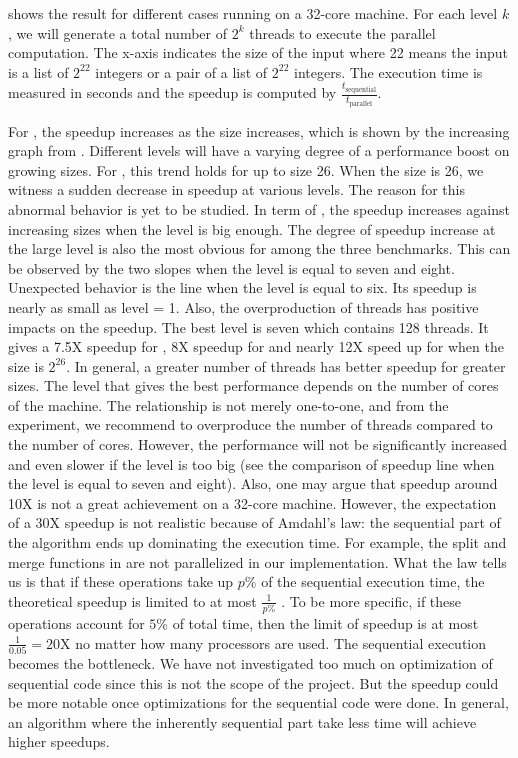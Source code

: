  shows the result for different cases running on a 32-core machine. For each level $k$, we will generate a total number of $2^k$ threads to execute the parallel computation. The x-axis indicates the size of the input where 22 means the input is a list of $2^{22}$ integers or a pair of a list of $2^{22}$ integers. The execution time is measured in seconds and the speedup is computed by $\frac{t_{\text{sequential}}}{t_\text{parallel}}$. 

For , the speedup increases as the size increases, which is shown by the increasing graph from . Different levels will have a varying degree of a performance boost on growing sizes. For , this trend holds for up to size 26. When the size is 26, we witness a sudden decrease in speedup at various levels. The reason for this abnormal behavior is yet to be studied. In term of , the speedup increases against increasing sizes when the level is big enough. The degree of speedup increase at the large level is also the most obvious for  among the three benchmarks. This can be observed by the two slopes when the level is equal to seven and eight. Unexpected behavior is the line when the level is equal to six. Its speedup is nearly as small as level = 1. Also, the overproduction of threads has positive impacts on the speedup. The best level is seven which contains 128 threads. It gives a 7.5X speedup for , 8X speedup for  and nearly 12X speed up for  when the size is $2^{26}$. In general, a greater number of threads has better speedup for greater sizes. The level that gives the best performance depends on the number of cores of the machine. The relationship is not merely one-to-one, and from the experiment, we recommend to overproduce the number of threads compared to the number of cores. However, the performance will not be significantly increased and even slower if the level is too big (see the comparison of speedup line when the level is equal to seven and eight). Also, one may argue that speedup around 10X is not a great achievement on a 32-core machine. However, the expectation of a 30X speedup is not realistic because of Amdahl's law: the sequential part of the algorithm ends up dominating the execution time. For example, the split and merge functions in  are not parallelized in our implementation. What the law tells us is that if these operations take up $p\%$ of the sequential execution time, the theoretical speedup is limited to at most $\frac{1}{p\%}$ \cite{AmdahlLaw2019}. To be more specific, if these operations account for $5\%$ of total time, then the limit of speedup is at most $\frac{1}{0.05} = 20$X no matter how many processors are used. The sequential execution becomes the bottleneck. We have not investigated too much on optimization of sequential code since this is not the scope of the project. But the speedup could be more notable once optimizations for the sequential code were done. In general, an algorithm where the inherently sequential part take less time will achieve higher speedups.